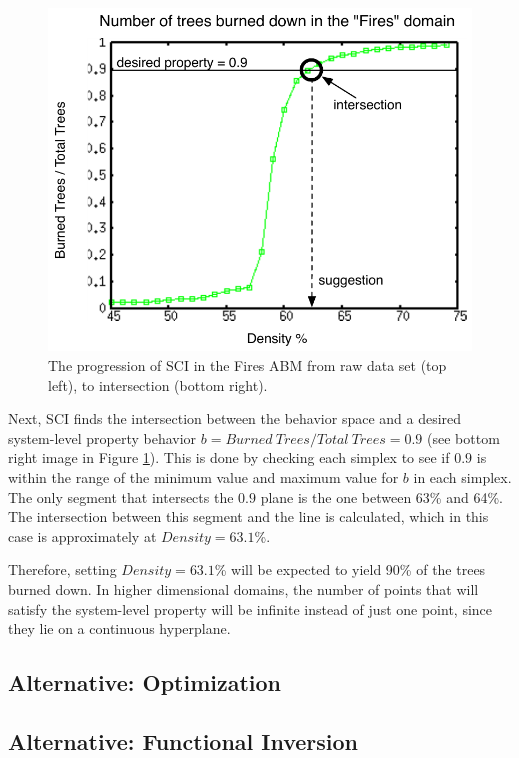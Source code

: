\begin{figure}[ht]
\includegraphics[scale=.5]{images/rii5.pdf}
\caption{The progression of SCI in the Fires ABM from raw data set (top left), to intersection (bottom right). }
\label{fig:rii}
\end{figure}

Next, SCI finds the intersection between the behavior space and a desired system-level property behavior $b = Burned~{ }Trees / Total~{ }Trees = 0.9$ (see bottom right image in Figure \ref{fig:rii}).
This is done by checking each simplex to see if $0.9$ is within the range of the minimum value and maximum value for $b$ in each simplex.
The only segment that intersects the $0.9$ plane is the one between 63\% and 64\%.
The intersection between this segment and the line is calculated, which in this case is approximately at $Density = 63.1$\%.

Therefore, setting $Density = 63.1$\% will be expected to yield 90\% of the trees burned down.
In higher dimensional domains, the number of points that will satisfy the system-level property will be infinite instead of just one point, since they lie on a continuous hyperplane.





\subsection{Alternative: Optimization}

\subsection{Alternative: Functional Inversion}
\label{subsec:funcinvert}

